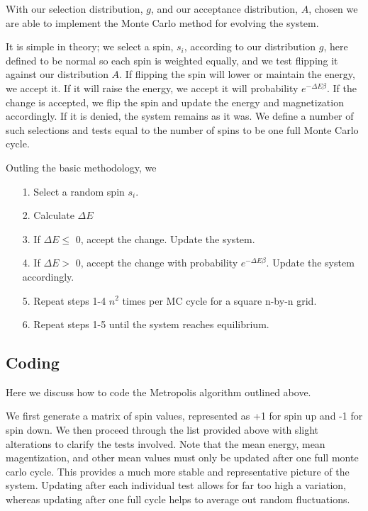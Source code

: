 \documentclass[11pt,a4paper]{article}
\begin{document}
With our selection distribution, $g$, and our acceptance distribution, $A$, chosen we are able to implement the Monte Carlo method for evolving the system. 

It is simple in theory; we select a spin, $s_i$, according to our distribution $g$, here defined to be normal so each spin is weighted equally, and we test flipping it against our distribution $A$. If flipping the spin will lower or maintain the energy, we accept it. If it will raise the energy, we accept it will probability $e^{-\Delta E\beta}$. If the change is accepted, we flip the spin and update the energy and magnetization accordingly. If it is denied, the system remains as it was. We define a number of such selections and tests equal to the number of spins to be one full Monte Carlo cycle.

Outling the basic methodology, we
\begin{enumerate}
\item[1.]
Select a random spin $s_i$.
\item[2.]
Calculate $\Delta E$
\item[3.]
If $\Delta E \leq$ 0, accept the change. Update the system.
\item[4.]
If $\Delta E >$ 0, accept the change with probability $e^{-\Delta E\beta}$. Update the system accordingly.
\item[5.]
Repeat steps 1-4 $n^2$ times per MC cycle for a square n-by-n grid.
\item[6.]
Repeat steps 1-5 until the system reaches equilibrium.
\end{enumerate}

\subsection{Coding}

Here we discuss how to code the Metropolis algorithm outlined above.

We first generate a matrix of spin values, represented as +1 for spin up and -1 for spin down. We then proceed through the list provided above with slight alterations to clarify the tests involved. Note that the mean energy, mean magentization, and other mean values must only be updated after one full monte carlo cycle. This provides a much more stable and representative picture of the system. Updating after each individual test allows for far too high a variation, whereas updating after one full cycle helps to average out random fluctuations.
\end{document}
